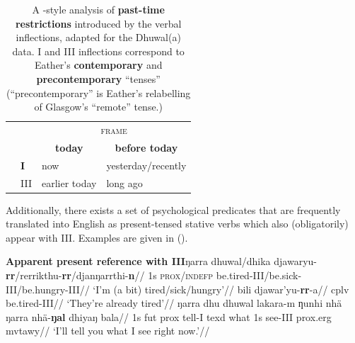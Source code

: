 \begin{table}[h]\centering\onehalfspacing
		\caption[Tense and temporal frames à la \citealt{Glasgow1964}]{A \citealt{Glasgow1964}-style analysis of \textbf{past-time restrictions} introduced by the verbal inflections, adapted for the Dhuwal(a) data. \gls{I} and \gls{III} inflections correspond to Eather's \textbf{contemporary} and \textbf{precontemporary} ``tenses'' (``precontemporary'' is Eather's \citeyearpar[166]{Eather2011} relabelling of Glasgow's ``remote'' tense.)}\label{GlaswegianTR}
	\begin{tabular}{@{}llll@{}}\toprule
		
		&                 & \multicolumn{2}{c}{\textsc{frame}}          \\ 
		&                 & \multicolumn{1}{c}{\textbf{today}}         & \multicolumn{1}{c}{\textbf{before today}}      \\\midrule
		\multirow{2}{*}{\textsc{\rotatebox[origin=c]{90}{infl}}} & \textbf{\phantom{\gls{I}}\gls{I}}    & now           & yesterday/recently \\
		& \gls{III} & earlier today & long ago           \\ \bottomrule%
	\end{tabular}
\end{table}


Additionally, there exists a set of psychological predicates that are frequently translated into English as present-tensed stative verbs which also (obligatorily) appear with \gls{III}. Examples are given in (\nextx).


\pex{}\textbf{Apparent present reference with \gls{III}}\a\begingl\gla ŋarra dhuwal/dhika djawaryu-\textbf{rr}/rerrikthu-\textbf{rr}/djanŋarrthi-\textbf{n}//
\glb 1s \textsc{prox/indefp} be.tired-\gls{III}/be.sick-\gls{III}/be.hungry-\gls{III}//
\glft`I'm (a bit) tired/sick/hungry'//\endgl
\a\begingl\gla bili djawar'yu-\textbf{rr}-a//
\glb \gls{cplv} be.tired-\gls{III}//
\glft`They're already tired'//\endgl
\a{}\begingl\gla ŋarra dhu dhuwal lakara-m ƞunhi nhä ŋarra nhä-\textbf{ŋal} dhiyaŋ bala//
\glb 1s \gls{fut} \gls{prox} tell-\gls{I} \gls{texd} what 1s see-\gls{III} \gls{prox}.\gls{erg} \gls{mvtawy}//
\glft`I'll tell you what I see right now.'//\endgl
\xe


